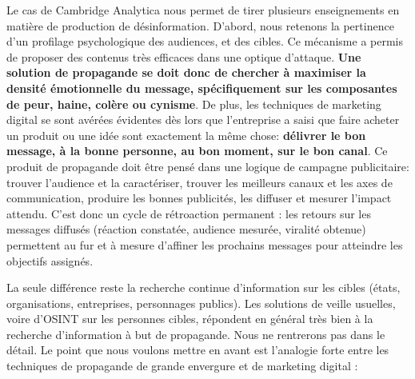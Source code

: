 \documentclass[11pt]{article}
\begin{document}
		Le cas de \og{}Cambridge Analytica nous permet de tirer plusieurs enseignements en matière de production de désinformation. D'abord, nous retenons la pertinence d'un profilage psychologique des audiences, et des cibles. Ce mécanisme a permis de proposer des contenus très efficaces dans une optique d'attaque. \textbf{Une solution de propagande se doit donc de chercher à maximiser la densité émotionnelle du message, spécifiquement sur les composantes de peur, haine, colère ou cynisme}. De plus, les techniques de marketing digital se sont avérées évidentes dès lors que l'entreprise a saisi que faire acheter un produit ou une idée sont exactement la même chose:  \textbf{délivrer le bon message, à la bonne personne, au bon moment, sur le bon canal}. Ce produit de propagande doit être pensé dans une logique de campagne publicitaire: trouver l'audience et la caractériser, trouver les meilleurs canaux et les axes de communication, produire les bonnes publicités, les diffuser et mesurer l'impact attendu. C'est donc un cycle de rétroaction permanent : les retours sur les messages diffusés (réaction constatée, audience mesurée, viralité obtenue) permettent au fur et à mesure d'affiner les prochains messages pour atteindre les objectifs assignés.


		La seule différence reste la recherche continue d'information sur les cibles (états, organisations, entreprises, personnages publics). Les solutions de veille usuelles, voire d'OSINT sur les personnes cibles, répondent en général très bien à la recherche d'information à but de propagande. Nous ne rentrerons pas dans le détail. Le point que nous voulons mettre en avant est l'analogie forte entre les techniques de propagande de grande envergure et de marketing digital : 
		
\end{document}
